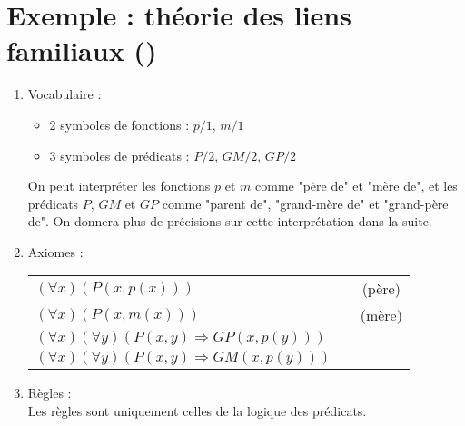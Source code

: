 \section*{Exemple : théorie des liens familiaux ()}
\begin{enumerate}
\item Vocabulaire : 
\begin{itemize}
\item 2 symboles de fonctions : $p/1$, $m/1$
\item 3 symboles de prédicats : $P/2$, $GM/2$, $GP/2$\\
\end{itemize}

On peut interpréter les fonctions $p$ et $m$ comme "père de" et "mère de", et les prédicats $P$, $GM$ et $GP$ comme "parent de", "grand-mère de" et "grand-père de". On donnera plus de précisions sur cette interprétation dans la suite.\\

\item Axiomes : \\
\begin{center}
\begin{tabular}{lcc}
$(\forall x) \left(P(x,p(x))\right)$ & \hspace*{2cm}& (père)\\
$(\forall x) \left(P(x,m(x))\right)$ & \hspace*{2cm}& (mère)\\
$(\forall x)(\forall y) \left(P(x,y)\Rightarrow GP(x,p(y)) \right)$&&\\
$(\forall x)(\forall y) \left(P(x,y)\Rightarrow GM(x,p(y)) \right)$&&\\
\end{tabular}
\end{center}

\item Règles : \\
Les règles sont uniquement celles de la logique des prédicats.
\end{enumerate}
